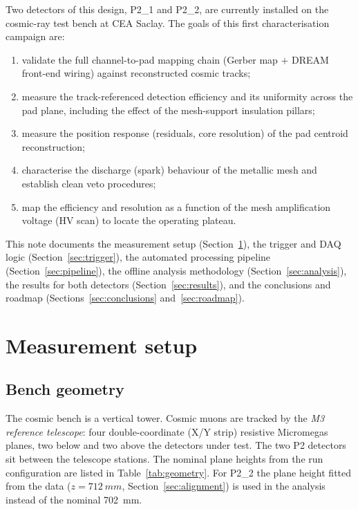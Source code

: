 \documentclass[11pt,a4paper]{article}
\newcommand{\detone}{P2\_1}
\newcommand{\dettwo}{P2\_2}
\begin{document}
Two detectors of this design, \detone{} and \dettwo{}, are currently installed
on the cosmic-ray test bench at CEA Saclay. The goals of this first
characterisation campaign are:

\begin{enumerate}[itemsep=2pt]
  \item validate the full channel-to-pad mapping chain (Gerber map $+$ DREAM
        front-end wiring) against reconstructed cosmic tracks;
  \item measure the track-referenced detection efficiency and its uniformity
        across the pad plane, including the effect of the mesh-support
        insulation pillars;
  \item measure the position response (residuals, core resolution) of the pad
        centroid reconstruction;
  \item characterise the discharge (spark) behaviour of the metallic mesh and
        establish clean veto procedures;
  \item map the efficiency and resolution as a function of the mesh
        amplification voltage (HV scan) to locate the operating plateau.
\end{enumerate}

This note documents the measurement setup
(Section~\ref{sec:setup}), the trigger and DAQ logic
(Section~\ref{sec:trigger}), the automated processing pipeline
(Section~\ref{sec:pipeline}), the offline analysis methodology
(Section~\ref{sec:analysis}), the results for both detectors
(Section~\ref{sec:results}), and the conclusions and roadmap
(Sections~\ref{sec:conclusions} and~\ref{sec:roadmap}).

\section{Measurement setup}
\label{sec:setup}

\subsection{Bench geometry}

The cosmic bench is a vertical tower. Cosmic muons are tracked by the
\emph{M3 reference telescope}: four double-coordinate (X/Y strip) resistive
Micromegas planes, two below and two above the detectors under test.
The two P2 detectors sit between the telescope stations. The nominal plane
heights from the run configuration are listed in
Table~\ref{tab:geometry}. For \dettwo{} the plane height fitted from the data
($z = \SI{712}{mm}$, Section~\ref{sec:alignment}) is used in the analysis
instead of the nominal \SI{702}{mm}.
\end{document}
